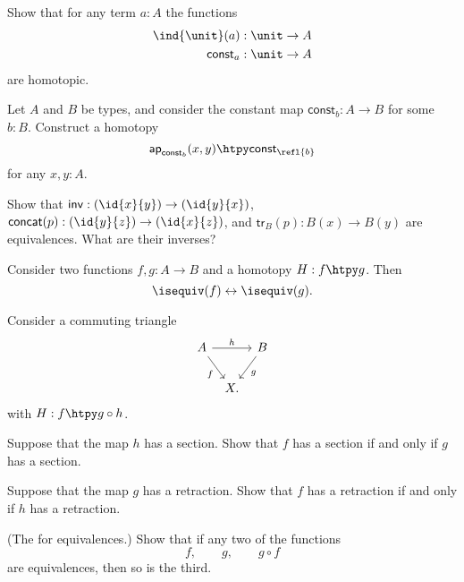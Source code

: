 \begin{exercises}
\item Show that for any term $a:A$ the functions
\begin{align*}
\ind{\unit}(a) & : \unit \to A \\
\mathsf{const}_a & : \unit \to A
\end{align*}
are homotopic.
\item Let $A$ and $B$ be types, and consider the constant map $\mathsf{const}_b:A\to B$ for some $b:B$. Construct a homotopy
\begin{equation*}
\mathsf{ap}_{\mathsf{const}_b}(x,y)\htpy \mathsf{const}_{\refl{b}}
\end{equation*}
for any $x,y:A$.
\item \label{ex:equiv_grpd_ops}Show that $\mathsf{inv}:(\id{x}{y})\to(\id{y}{x})$, $\mathsf{concat}(p):(\id{y}{z})\to(\id{x}{z})$, and $\mathsf{tr}_B(p):B(x)\to B(y)$ are equivalences. What are their inverses?
\item \label{ex:htpy_equiv} Consider two functions $f,g:A\to B$ and a homotopy $H:f\htpy g$. Then
\begin{equation*}
\isequiv(f)\leftrightarrow\isequiv(g).
\end{equation*}
\item \label{ex:3_for_2}
Consider a commuting triangle
\begin{equation*}
\begin{tikzcd}[column sep=tiny]
A \arrow[rr,"h"] \arrow[dr,swap,"f"] & & B \arrow[dl,"g"] \\
& X.
\end{tikzcd}
\end{equation*}
with $H:f\htpy g\circ h$.
\begin{subexenum}
\item Suppose that the map $h$ has a section. Show that $f$ has a section if and only if $g$ has a section.
\item Suppose that the map $g$ has a retraction. Show that $f$ has a retraction if and only if $h$ has a retraction.
\item (The  for equivalences.) Show that if any two of the functions
\begin{equation*}
f,\qquad g,\qquad g\circ f
\end{equation*}
are equivalences, then so is the third.
\end{subexenum}
\item \label{ex:neg_equiv} 

\end{exercises}
